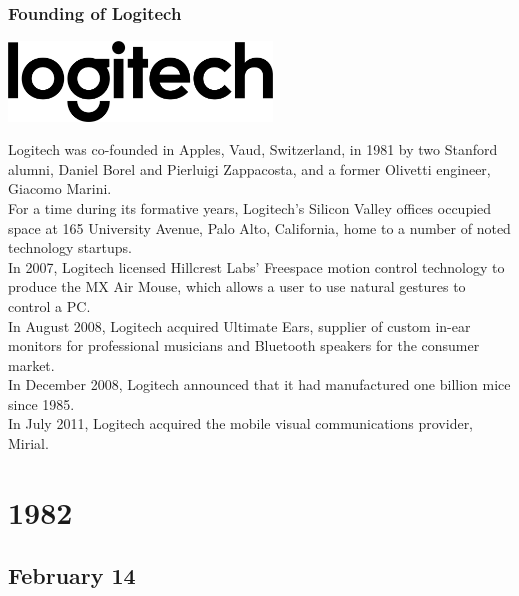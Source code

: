 \documentclass[11pt]{report}
\begin{document}
\subsection{Founding of Logitech}
\vspace{2mm}\begin{center}\includegraphics[width=7cm]{./img/logitechLogo.jpg}\end{center}
Logitech was co-founded in Apples, Vaud, Switzerland, in 1981 by two Stanford alumni, Daniel Borel and Pierluigi Zappacosta, and a former Olivetti engineer, Giacomo Marini.\\
\indent For a time during its formative years, Logitech's Silicon Valley offices occupied space at 165 University Avenue, Palo Alto, California, home to a number of noted technology startups.\\
\indent In 2007, Logitech licensed Hillcrest Labs' Freespace motion control technology to produce the MX Air Mouse, which allows a user to use natural gestures to control a PC.\\
\indent In August 2008, Logitech acquired Ultimate Ears, supplier of custom in-ear monitors for professional musicians and Bluetooth speakers for the consumer market.\\
\indent In December 2008, Logitech announced that it had manufactured one billion mice since 1985.\\
\indent In July 2011, Logitech acquired the mobile visual communications provider, Mirial.\\

\chapter{1982}
\section{February 14}
\end{document}
